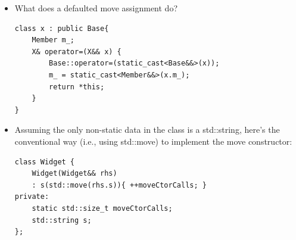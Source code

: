 \documentclass[a4paper,11pt,twoside]{book}
\begin{document}
\begin{itemize}
	\item What does a defaulted move assignment do?
	\begin{lstlisting}[numbers=none]
class x : public Base{
	Member m_;
	X& operator=(X&& x) {
		Base::operator=(static_cast<Base&&>(x));
		m_ = static_cast<Member&&>(x.m_);
		return *this;
	}
}
\end{lstlisting}
	
	
	\item Assuming the only non-static data in the class is a std::string, here's the conventional way (i.e., using std::move) to implement the move constructor:
\begin{lstlisting}[numbers=none]
class Widget {
	Widget(Widget&& rhs)
	: s(std::move(rhs.s)){ ++moveCtorCalls; }
private:
	static std::size_t moveCtorCalls;
	std::string s;
};
\end{lstlisting}
\end{itemize}
\end{document}
